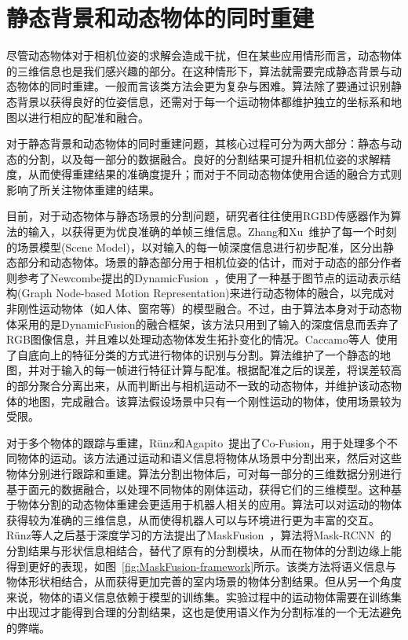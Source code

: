 \section{静态背景和动态物体的同时重建}
\label{subsec:static_and_dynamic}

尽管动态物体对于相机位姿的求解会造成干扰，但在某些应用情形而言，动态物体的三维信息也是我们感兴趣的部分。在这种情形下，算法就需要完成静态背景与动态物体的同时重建。一般而言该类方法会更为复杂与困难。算法除了要通过识别静态背景以获得良好的位姿信息，还需对于每一个运动物体都维护独立的坐标系和地图以进行相应的配准和融合。

对于静态背景和动态物体的同时重建问题，其核心过程可分为两大部分：静态与动态的分割，以及每一部分的数据融合。良好的分割结果可提升相机位姿的求解精度，从而使得重建结果的准确度提升；而对于不同动态物体使用合适的融合方式则影响了所关注物体重建的结果。

目前，对于动态物体与静态场景的分割问题，研究者往往使用RGBD传感器作为算法的输入，以获得更为优良准确的单帧三维信息。Zhang和Xu~\cite{2017MixedFusion}维护了每一个时刻的场景模型(Scene Model)，以对输入的每一帧深度信息进行初步配准，区分出静态部分和动态物体。场景的静态部分用于相机位姿的估计，而对于动态的部分作者则参考了Newcombe提出的DynamicFusion~\cite{2015DynamicFusion}，使用了一种基于图节点的运动表示结构(Graph Node-based Motion Representation)来进行动态物体的融合，以完成对非刚性运动物体（如人体、窗帘等）的模型融合。不过，由于算法本身对于动态物体采用的是DynamicFusion的融合框架，该方法只用到了输入的深度信息而丢弃了RGB图像信息，并且难以处理动态物体发生拓扑变化的情况。Caccamo等人~\cite{2017Joint3D}使用了自底向上的特征分类的方式进行物体的识别与分割。算法维护了一个静态的地图，并对于输入的每一帧进行特征计算与配准。根据配准之后的误差，将误差较高的部分聚合分离出来，从而判断出与相机运动不一致的动态物体，并维护该动态物体的地图，完成融合。该算法假设场景中只有一个刚性运动的物体，使用场景较为受限。


对于多个物体的跟踪与重建，R\"unz和Agapito~\cite{2017CoFusion}提出了Co-Fusion，用于处理多个不同物体的运动。该方法通过运动和语义信息将物体从场景中分割出来，然后对这些物体分别进行跟踪和重建。算法分割出物体后，可对每一部分的三维数据分别进行基于面元的数据融合，以处理不同物体的刚体运动，获得它们的三维模型。这种基于物体分割的动态物体重建会更适用于机器人相关的应用。算法可以对运动的物体获得较为准确的三维信息，从而使得机器人可以与环境进行更为丰富的交互。R\"unz等人之后基于深度学习的方法提出了MaskFusion~\cite{2018MaskFusion}，算法将Mask-RCNN~\cite{2017MaskRCNN}的分割结果与形状信息相结合，替代了原有的分割模块，从而在物体的分割边缘上能得到更好的表现，如图~\ref{fig:MaskFusion-framework}所示。该类方法将语义信息与物体形状相结合，从而获得更加完善的室内场景的物体分割结果。但从另一个角度来说，物体的语义信息依赖于模型的训练集。实验过程中的运动物体需要在训练集中出现过才能得到合理的分割结果，这也是使用语义作为分割标准的一个无法避免的弊端。

